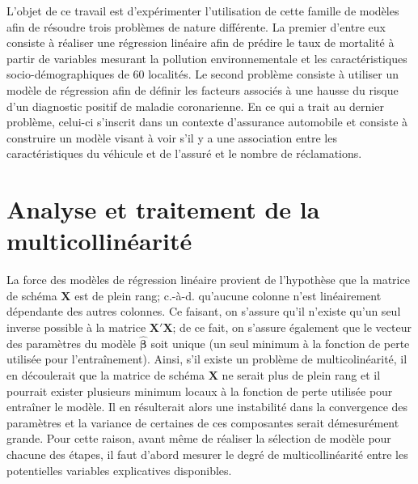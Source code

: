 \documentclass{article}
\begin{document}
L'objet de ce travail est d'expérimenter l'utilisation de cette famille de modèles afin de résoudre trois problèmes de nature différente. 
%
La premier d'entre eux consiste à réaliser une régression linéaire afin de prédire le taux de mortalité à partir de variables mesurant la pollution environnementale et les caractéristiques socio-démographiques de 60 localités.
%
Le second problème consiste à utiliser un modèle de régression afin de définir les facteurs associés à une hausse du risque d’un diagnostic positif de maladie coronarienne.
%
En ce qui a trait au dernier problème, celui-ci s'inscrit dans un contexte d'assurance automobile et consiste à construire un modèle visant à voir s’il y a une association entre les caractéristiques du véhicule et de l'assuré et le nombre de réclamations.


\section{Analyse et traitement de la multicollinéarité}\label{sect_multicollinearite}
La force des modèles de régression linéaire provient de l'hypothèse que la matrice de schéma $\boldsymbol{X}$ est de plein rang; c.-à-d. qu'aucune colonne n'est linéairement dépendante des autres colonnes. Ce faisant, on s'assure qu'il n'existe qu'un seul inverse possible à la matrice $\boldsymbol{X}'\boldsymbol{X}$; de ce fait, on s'assure également que le vecteur des paramètres du modèle $\hat{\boldsymbol{\beta}}$ soit unique (un seul minimum à la fonction de perte utilisée pour l'entraînement). Ainsi, s'il existe un problème de multicolinéarité, il en découlerait que la matrice de schéma $\boldsymbol{X}$ ne serait plus de plein rang et il pourrait exister plusieurs minimum locaux à la fonction de perte utilisée pour entraîner le modèle. Il en résulterait alors une instabilité dans la convergence des paramètres et la variance de certaines de ces composantes serait démesurément grande.
%
Pour cette raison, avant même de réaliser la sélection de modèle pour chacune des étapes, il faut d'abord mesurer le degré de multicollinéarité entre les potentielles variables explicatives disponibles.\\
\end{document}
